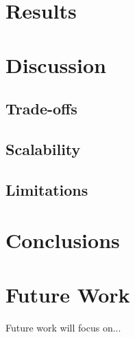 \documentclass[conference,a4paper]{IEEEtran}
\begin{document}
\section{Results}


\section{Discussion}

\subsection{Trade-offs}

\subsection{Scalability}

\subsection{Limitations}

\section{Conclusions}


\section{Future Work}

Future work will focus on...

\end{document}
